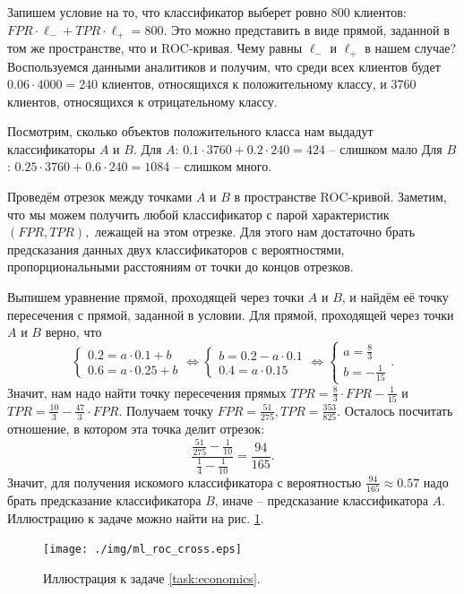 \documentclass[12pt,a4paper]{article}
\begin{document}
\begin{esSolution}
Запишем условие на то, что классификатор выберет ровно 800 клиентов: $FPR \cdot \ell_{-} + TPR \cdot \ell_{+} = 800.$
Это можно представить в виде прямой, заданной в том же пространстве, что и ROC-кривая.
Чему равны $\ell_{-}$ и $\ell_{+}$ в нашем случае?
Воспользуемся данными аналитиков и получим, что среди всех клиентов будет $0.06 \cdot 4000 = 240$ клиентов, относящихся к положительному классу, и 3760 клиентов, относящихся к отрицательному классу.

Посмотрим, сколько объектов положительного класса нам выдадут классификаторы $A$ и $B$.
Для $A$: $0.1 \cdot 3760 + 0.2 \cdot 240 = 424$ -- слишком мало
Для $B$: $0.25 \cdot 3760 + 0.6 \cdot 240 = 1084$ -- слишком много.

Проведём отрезок между точками $A$ и $B$ в пространстве ROC-кривой.
Заметим, что мы можем получить любой классификатор с парой характеристик $(FPR, TPR),$ лежащей на этом отрезке.
Для этого нам достаточно брать предсказания данных двух классификаторов с вероятностями, пропорциональными расстояниям от точки до концов отрезков.

Выпишем уравнение прямой, проходящей через точки $A$ и $B$, и найдём её точку пересечения с прямой, заданной в условии.
Для прямой, проходящей через точки $A$ и $B$ верно, что 
$$
\begin{cases}
    0.2 = a \cdot 0.1 + b\\
    0.6 = a \cdot 0.25 + b
\end{cases}
\Leftrightarrow 
\begin{cases}
    b = 0.2 - a \cdot 0.1\\
    0.4 = a \cdot 0.15
\end{cases}\Leftrightarrow \begin{cases}
    a = \frac{8}{3}\\
    b = -\frac{1}{15}
\end{cases}.
$$
Значит, нам надо найти точку пересечения прямых $TPR = \frac{8}{3} \cdot FPR - \frac{1}{15}$ и $TPR = \frac{10}{3} - \frac{47}{3} \cdot FPR.$ Получаем точку $FPR = \frac{51}{275}, TPR = \frac{353}{825}.$
Осталось посчитать отношение, в котором эта точка делит отрезок:
$$\frac{\frac{51}{275} - \frac{1}{10}}{\frac{1}{4} - \frac{1}{10}} = \frac{94}{165}.$$
Значит, для получения искомого классификатора с вероятностью $\frac{94}{165} \approx 0.57$ надо брать предсказание классификатора $B$, иначе -- предсказание классификатора $A$.
Иллюстрацию к задаче можно найти на рис. \ref{fig:const}.

\begin{figure}[th!]
	\centering
	\texttt{[image: ./img/ml\_roc\_cross.eps]}
	\caption{Иллюстрация к задаче \ref{task:economics}.}
 \label{fig:const}
\end{figure}

\end{esSolution}
\end{document}
